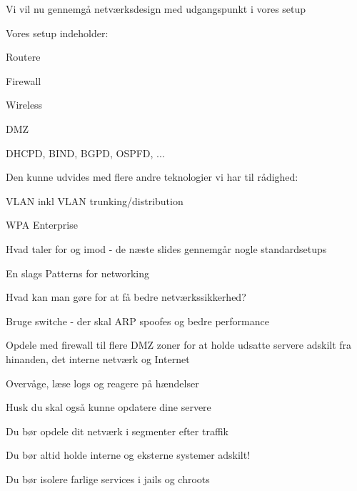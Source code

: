 \begin{list1}
\item Vi vil nu gennemgå netværksdesign med udgangspunkt i vores setup
\item Vores setup indeholder:
\begin{list2}
\item Routere
\item Firewall
\item Wireless
\item DMZ
\item DHCPD, BIND, BGPD, OSPFD, ...
\end{list2}
\item Den kunne udvides med flere andre teknologier vi har til rådighed:
\begin{list2}
\item VLAN inkl VLAN trunking/distribution
\item WPA Enterprise
\end{list2}
\item Hvad taler for og imod - de næste slides gennemgår nogle standardsetups
\item En slags Patterns for networking
\end{list1}






\begin{list1}
\item Hvad kan man gøre for at få bedre netværkssikkerhed?
\begin{list2}
\item Bruge switche - der skal ARP spoofes og bedre performance
\item Opdele med firewall til flere DMZ zoner for at holde
      udsatte servere adskilt fra hinanden, det interne netværk og
      Internet
\item Overvåge, læse logs og reagere på hændelser 
\end{list2}
\item Husk du skal også kunne opdatere dine servere
\end{list1}



\begin{list1}
\item Du bør opdele dit netværk i segmenter efter traffik
\item Du bør altid holde interne og eksterne systemer adskilt!
\item Du bør isolere farlige services i jails og chroots
\end{list1}



